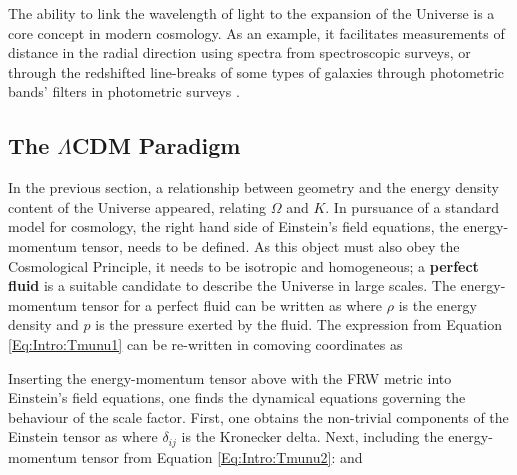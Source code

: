 \qquad The ability to link the wavelength of light to the expansion of the Universe is a core concept in modern cosmology. As an example, it facilitates measurements of distance in the radial direction using spectra from spectroscopic surveys, or through the redshifted line-breaks of some types of galaxies through photometric bands' filters in photometric surveys \citep{AbdallaPhotoZ2011,2018-redshift}.


\subsection{The $\Lambda$CDM Paradigm}\label{Sec:Intro:LCDM}
In the previous section, a relationship between geometry and the energy density content of the Universe appeared, relating $\Omega$ and $K$. In pursuance of a standard model for cosmology, the right hand side of Einstein's field equations, the energy-momentum tensor, needs to be defined. As this object must also obey the Cosmological Principle, it needs to be isotropic and homogeneous; a \textbf{perfect fluid} is a suitable candidate to describe the Universe in large scales. The energy-momentum tensor for a perfect fluid can be written as
where $\rho$ is the energy density and $p$ is the pressure exerted by the fluid. The expression from Equation \eqref{Eq:Intro:Tmunu1} can be re-written in comoving coordinates as

\qquad Inserting the energy-momentum tensor above with the FRW metric into Einstein's field equations, one finds the dynamical equations governing the behaviour of the scale factor. First, one obtains the non-trivial components of the Einstein tensor as
where $\delta_{ij}$ is the Kronecker delta. Next, including the energy-momentum tensor from Equation \eqref{Eq:Intro:Tmunu2}:
and

